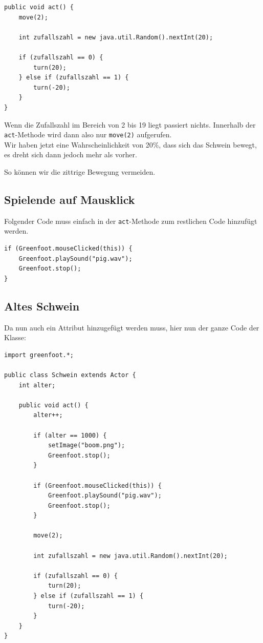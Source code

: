 \documentclass{scrartcl}   %
\begin{document}
\newpage

\begin{lstlisting}
public void act() {
    move(2);
    
    int zufallszahl = new java.util.Random().nextInt(20);
    
    if (zufallszahl == 0) {
        turn(20);
    } else if (zufallszahl == 1) { 
        turn(-20);
    }
}    
\end{lstlisting}

Wenn die Zufallszahl im Bereich von 2 bis 19 liegt passiert nichts. Innerhalb der \texttt{act}-Methode wird dann also nur \texttt{move(2)} aufgerufen.\\
Wir haben jetzt eine Wahrscheinlichkeit von 20\%, dass sich das Schwein bewegt, es dreht sich dann jedoch mehr als vorher.

So können wir die zittrige Bewegung vermeiden.

\subsection{Spielende auf Mausklick}

Folgender Code muss einfach in der \texttt{act}-Methode zum restlichen Code hinzufügt werden.\\
\begin{lstlisting}
if (Greenfoot.mouseClicked(this)) {
    Greenfoot.playSound("pig.wav");
    Greenfoot.stop();
}
\end{lstlisting}

\newpage

\subsection{Altes Schwein}

Da nun auch ein Attribut hinzugefügt werden muss, hier nun der ganze Code der Klasse:\\
\begin{lstlisting}
import greenfoot.*;

public class Schwein extends Actor {
    int alter;
    
    public void act() {
        alter++;
        
        if (alter == 1000) {
            setImage("boom.png");
            Greenfoot.stop();
        }
        
        if (Greenfoot.mouseClicked(this)) {
            Greenfoot.playSound("pig.wav");
            Greenfoot.stop();
        }
        
        move(2);
        
        int zufallszahl = new java.util.Random().nextInt(20);
        
        if (zufallszahl == 0) {
            turn(20);
        } else if (zufallszahl == 1) { 
            turn(-20);
        }
    }    
}
\end{lstlisting}
\end{document}
